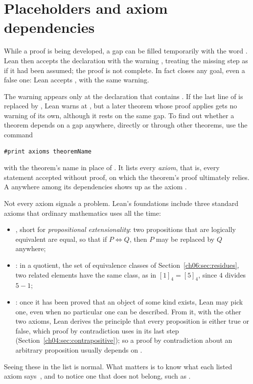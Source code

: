 \section{Placeholders and axiom dependencies}\label{ch16:sec:axioms}
While a proof is being developed, a gap can be filled temporarily with the word . Lean then accepts the declaration with the warning , treating the missing step as if it had been assumed; the proof is not complete. In fact  closes any goal, even a false one: Lean accepts , with the same warning.

The warning appears only at the declaration that contains . If the last line of  is replaced by , Lean warns at , but a later theorem whose proof applies  gets no warning of its own, although it rests on the same gap. To find out whether a theorem depends on a gap anywhere, directly or through other theorems, use the command
\par\noindent\begin{minipage}{\linewidth}
\begin{lstlisting}
#print axioms theoremName
\end{lstlisting}
\end{minipage}\par
with the theorem's name in place of . It lists every \emph{axiom}, that is, every statement accepted without proof, on which the theorem's proof ultimately relies. A  anywhere among its dependencies shows up as the axiom .

Not every axiom signals a problem. Lean's foundations include three standard axioms that ordinary mathematics uses all the time:
\begin{itemize}
\item {}, short for \emph{propositional extensionality}: two propositions that are logically equivalent are equal, so that if $P\Leftrightarrow Q$, then $P$ may be replaced by $Q$ anywhere;
\item {}: in a quotient, the set of equivalence classes of Section~\ref{ch06:sec:residues}, two related elements have the same class, as in $[1]_4=[5]_4$, since $4$ divides $5-1$;
\item {}: once it has been proved that an object of some kind exists, Lean may pick one, even when no particular one can be described. From it, with the other two axioms, Lean derives the principle that every proposition is either true or false, which proof by contradiction uses in its last step (Section~\ref{ch04:sec:contrapositive}); so a proof by contradiction about an arbitrary proposition usually depends on .
\end{itemize}
Seeing these in the list is normal. What matters is to know what each listed axiom says~\cite{leanaxioms}, and to notice one that does not belong, such as .

